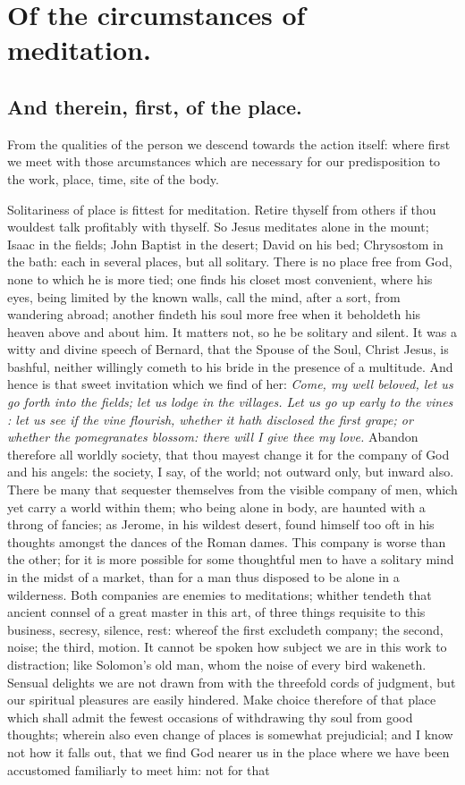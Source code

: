 \chapter{Of the circumstances of meditation.}
\section{And therein, first, of the place.}

From the qualities of the person we descend towards the action itself: where first we meet with those arcumstances which are necessary for our predisposition to the work, place, time, site of the body. 

Solitariness of place is fittest for meditation. Retire thyself from others if thou wouldest talk profitably with thyself. So Jesus meditates alone in the mount; Isaac in the fields; John Baptist in the desert; David on his bed; Chrysostom in the bath: each in several places, but all solitary. There is no place free from God, none to which he is more tied; one finds his closet most convenient, where his eyes, being limited by the known walls, call the mind, after a sort, from wandering abroad; another findeth his soul more free when it beholdeth his heaven above and about him. It matters not, so he be solitary and silent. It was a witty and divine speech of Bernard, that the Spouse of the Soul, Christ Jesus, is bashful, neither willingly cometh to his bride in the presence of a multitude. And hence is that sweet invitation which we find of her: \emph{Come, my well beloved, let us go forth into the fields; let us lodge in the villages. Let us go up early to the vines : let us see if the vine flourish, whether it hath disclosed the first grape; or whether the pomegranates blossom: there will I give thee my love.} Abandon therefore all worldly society, that thou mayest change it for the company of God and his angels: the society, I say, of the world; not outward only, but inward also. There be many that sequester themselves from the visible company of men, which yet carry a world within them; who being alone in body, are haunted with a throng of fancies; as Jerome, in his wildest desert, found himself too oft in his thoughts amongst the dances of the Roman dames. This company is worse than the other; for it is more possible for some thoughtful men to have a solitary mind in the midst of a market, than for a man thus disposed to be alone in a wilderness. Both companies are enemies to meditations; whither tendeth that ancient connsel of a great master in this art, of three things requisite to this business, secresy, silence, rest: whereof the first excludeth company; the second, noise; the third, motion. It cannot be spoken how subject we are in this work to distraction; like Solomon's old man, whom the noise of every bird wakeneth. Sensual delights we are not drawn from with the threefold cords of judgment, but our spiritual pleasures are easily hindered. Make choice therefore of that place which shall admit the fewest occasions of withdrawing thy soul from good thoughts; wherein also even change of places is somewhat prejudicial; and I know not how it falls out, that we find God nearer us in the place where we have been accustomed familiarly to meet him: not for that 